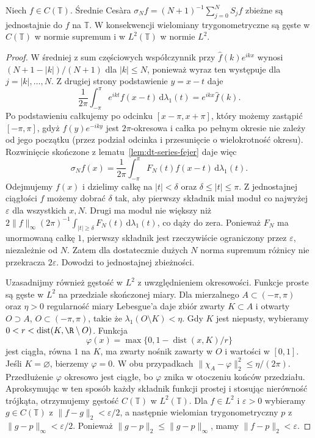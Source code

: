 \begin{twierdzenie}
\label{thm:dt-series-fejer}
Niech $f\in C(\mathbb T)$. Średnie Cesàra
$\sigma_N f=(N+1)^{-1}\sum_{j=0}^N S_jf$
zbieżne są jednostajnie do $f$ na $\mathbb T$.
W konsekwencji wielomiany trygonometryczne są gęste
w $C(\mathbb T)$ w normie supremum i w $L^2(\mathbb T)$
w normie $L^2$.
\end{twierdzenie}
\begin{proof}
W średniej z sum częściowych współczynnik
przy $\widehat f(k)e^{ikx}$ wynosi
$(N+1-|k|)/(N+1)$ dla $|k|\leq N$, ponieważ
wyraz ten występuje dla $j=|k|,\ldots,N$.
Z drugiej strony podstawienie $y=x-t$ daje
\[
 \frac1{2\pi}\int_{-\pi}^{\pi}e^{ikt}f(x-t)\,
 \mathrm d\lambda_1(t)=e^{ikx}\widehat f(k).
\]
Po podstawieniu całkujemy po odcinku
$[x-\pi,x+\pi]$, który możemy zastąpić
$[-\pi,\pi]$, gdyż $f(y)e^{-iky}$ jest
$2\pi$-okresowa i całka po pełnym okresie
nie zależy od jego początku (przez podział
odcinka i przesunięcie o wielokrotność okresu).
Rozwinięcie skończone z lematu~\ref{lem:dt-series-fejer}
daje więc
\[
 \sigma_Nf(x)=\frac1{2\pi}\int_{-\pi}^{\pi}
 F_N(t)f(x-t)\,\mathrm d\lambda_1(t).
\]
Odejmujemy $f(x)$ i dzielimy całkę na $|t|<\delta$
oraz $\delta\le|t|\le\pi$. Z jednostajnej ciągłości $f$
możemy dobrać $\delta$ tak, aby pierwszy składnik
miał moduł co najwyżej $\varepsilon$ dla wszystkich $x,N$.
Drugi ma moduł nie większy niż
$2\|f\|_\infty(2\pi)^{-1}\int_{|t|\ge\delta}F_N(t)
\,\mathrm d\lambda_1(t)$, co dąży do zera.
Ponieważ $F_N$ ma unormowaną całkę $1$, pierwszy
składnik jest rzeczywiście ograniczony przez
$\varepsilon$, niezależnie od $N$. Zatem dla
dostatecznie dużych $N$ norma supremum różnicy
nie przekracza $2\varepsilon$. Dowodzi to
jednostajnej zbieżności.

Uzasadnijmy również gęstość w $L^2$ z uwzględnieniem
okresowości. Funkcje proste są gęste w $L^2$
na przedziale skończonej miary. Dla mierzalnego
$A\subset(-\pi,\pi)$ oraz $\eta>0$ regularność
miary Lebesgue'a daje zbiór zwarty $K\subset A$
i otwarty $O\supset A$, $O\subset(-\pi,\pi)$,
takie że $\lambda_1(O\setminus K)<\eta$.
Gdy $K$ jest niepusty, wybieramy
$0<r<\operatorname{dist}(K,\R\setminus O)$.
Funkcja
\[
 \varphi(x)=\max\{0,1-\operatorname{dist}(x,K)/r\}
\]
jest ciągła, równa $1$ na $K$, ma zwarty nośnik
zawarty w $O$ i wartości w $[0,1]$.
Jeśli $K=\varnothing$, bierzemy $\varphi=0$.
W obu przypadkach
$\|\chi_A-\varphi\|_2^2\leq\eta/(2\pi)$.
Przedłużenie $\varphi$ okresowo jest ciągłe,
bo $\varphi$ znika w otoczeniu końców przedziału.
Aproksymując w ten sposób każdy składnik
funkcji prostej i stosując nierówność trójkąta,
otrzymujemy gęstość $C(\mathbb T)$ w $L^2(\mathbb T)$.
Dla $f\in L^2$ i $\varepsilon>0$ wybieramy
$g\in C(\mathbb T)$ z $\|f-g\|_2<\varepsilon/2$,
a następnie wielomian trygonometryczny $p$
z $\|g-p\|_\infty<\varepsilon/2$.
Ponieważ $\|g-p\|_2\leq\|g-p\|_\infty$,
mamy $\|f-p\|_2<\varepsilon$.
\end{proof}

